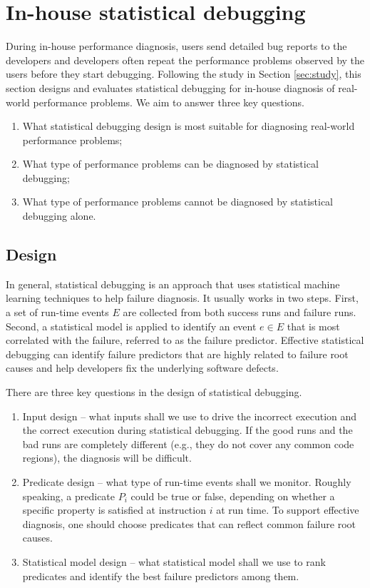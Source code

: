 \section{In-house statistical debugging}
\label{sec:inhouse}
During in-house performance diagnosis, users send detailed bug reports to
the developers and developers often repeat the performance problems
observed by the users before they start debugging.
Following the study in Section \ref{sec:study}, this section designs and
evaluates statistical debugging for in-house diagnosis of real-world
performance problems.
We aim to answer three key questions.

\begin{enumerate}
\item What statistical debugging design is most suitable for diagnosing
real-world performance problems;
\item What type of performance problems can be diagnosed by statistical
debugging;
\item What type of performance problems cannot be diagnosed by statistical
debugging alone.
\end{enumerate}

\subsection{Design}
In general, statistical debugging 
\cite{liblit03,liblit05,CCI,tarantula1,tarantula2,tarantula.darko,joy.asplos13}
is an approach that uses statistical machine learning techniques to help
failure diagnosis. It usually works in two steps.
First, a set of run-time 
events $E$ are collected from both success runs and failure runs.
Second, a statistical model is applied to identify an event $e \in E $
that is most correlated with the failure, referred to as the failure predictor. 
Effective statistical debugging can identify failure predictors that are
highly related to failure root causes and help developers fix the underlying
software defects.

There are three key questions in the design of statistical debugging.
\begin{enumerate}
\item Input design --
what inputs shall we use to drive the 
incorrect execution and the correct execution during statistical debugging.
If the good runs and the bad runs are completely different
(e.g., they do not cover any common code regions), the diagnosis will
be difficult.
\item Predicate design -- what type of run-time events shall we monitor.
Roughly speaking, a predicate $P_i$ could be true or false, depending on 
whether a specific property is satisfied at instruction $i$ at run time.
To support effective diagnosis, one should choose predicates that can reflect 
common failure root causes.
\item Statistical model design -- what statistical model shall we use to
rank predicates and identify the best failure predictors among them.
\end{enumerate}

